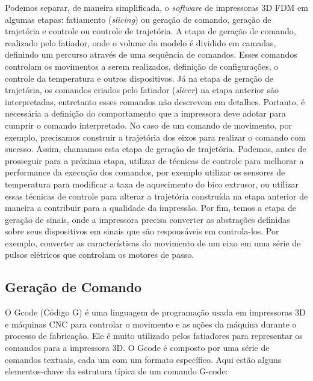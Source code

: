 Podemos separar, de maneira simplificada, o \textit{software} de impressoras 3D FDM em algumas etapas: fatiamento (\textit{slicing}) ou geração de comando, geração de trajetória e controle ou controle de trajetória. A etapa de geração de comando, realizado pelo fatiador, onde o volume do modelo é dividido em camadas, definindo um percurso através de uma sequência de comandos. Esses comandos controlam os movimentos a serem realizados, definição de configurações, o controle da temperatura e outros dispositivos. Já na etapa de geração de trajetória, os comandos criados pelo fatiador (\textit{slicer}) na etapa anterior são interpretadas, entretanto esses comandos não descrevem em detalhes. Portanto, é necessária a definição do comportamento que a impressora deve adotar para cumprir o comando interpretado. No caso de um comando de movimento, por exemplo, precisamos construir a trajetória dos eixos para realizar o comando com sucesso. Assim, chamamos esta etapa de geração de trajetória. Podemos, antes de prosseguir para a próxima etapa, utilizar de técnicas de controle para melhorar a performance da execução dos comandos, por exemplo utilizar os sensores de temperatura para modificar a taxa de aquecimento do bico extrusor, ou utilizar essas técnicas de controle para alterar a trajetória construída na etapa anterior de maneira a contribuir para a qualidade da impressão. Por fim, temos a etapa de geração de sinais, onde a impressora precisa converter as abstrações definidas sobre seus dispositivos em sinais que são responsáveis em controla-los. Por exemplo, converter as características do movimento de um eixo em uma série de pulsos elétricos que controlam os motores de passo. 

\subsection{Geração de Comando}

O Gcode (Código G) é uma linguagem de programação usada em impressoras 3D e máquinas CNC para controlar o movimento e as ações da máquina durante o processo de fabricação. Ele é muito utilizado pelos fatiadores para representar os comandos para a impressora 3D. O Gcode é composto por uma série de comandos textuais, cada um com um formato específico. Aqui estão alguns elementos-chave da estrutura típica de um comando G-code:

